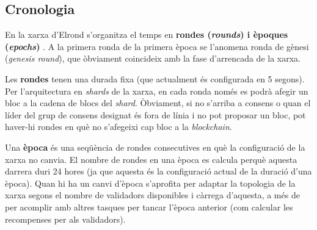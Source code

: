 \documentclass[11pt,a4paper]{article}
\begin{document}
\subsection{Cronologia}
En la xarxa d'Elrond s'organitza el temps en \textbf{rondes (\textit{rounds}) i èpoques (\textit{epochs})} \cite{elrond2022}. A la primera ronda de la primera època se l'anomena ronda de gènesi (\textit{genesis round}), que òbviament coincideix amb la fase d'arrencada de la xarxa.

Les \textbf{rondes} tenen una durada fixa (que actualment és configurada en 5 segons). Per l'arquitectura en \textit{shards} de la xarxa, en cada ronda només es podrà afegir un bloc a la cadena de blocs del \textit{shard}. Òbviament, si no s'arriba a consens o quan el líder del grup de consens designat és fora de línia i no pot proposar un bloc, pot haver-hi rondes en què no s'afegeixi cap bloc a la \textit{blockchain}.

Una \textbf{època} és una seqüència de rondes consecutives en què la configuració de la xarxa no canvia. El nombre de rondes en una època es calcula perquè aquesta darrera duri 24 hores (ja que aquesta és la configuració actual de la duració d'una època). Quan hi ha un canvi d'època s'aprofita per adaptar la topologia de la xarxa segons el nombre de validadors disponibles i càrrega d'aquesta, a més de per acomplir amb altres tasques per tancar l'època anterior (com calcular les recompenses per als validadors).
\medskip 
\end{document}
